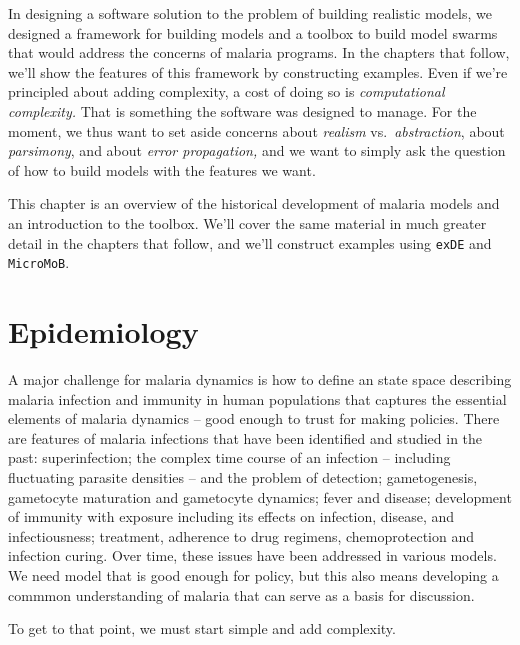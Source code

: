 \documentclass[
]{book}
\begin{document}
In designing a software solution to the problem of building realistic models, we designed a framework for building models and a toolbox to build model swarms that would address the concerns of malaria programs. In the chapters that follow, we'll show the features of this framework by constructing examples. Even if we're principled about adding complexity, a cost of doing so is \emph{computational complexity.} That is something the software was designed to manage. For the moment, we thus want to set aside concerns about \emph{realism} vs.~\emph{abstraction}, about \emph{parsimony}, and about \emph{error propagation,} and we want to simply ask the question of how to build models with the features we want.

This chapter is an overview of the historical development of malaria models and an introduction to the toolbox. We'll cover the same material in much greater detail in the chapters that follow, and we'll construct examples using \texttt{exDE} and \texttt{MicroMoB}.

\hypertarget{epidemiology}{%
\section{Epidemiology}\label{epidemiology}}

A major challenge for malaria dynamics is how to define an state space describing malaria infection and immunity in human populations that captures the essential elements of malaria dynamics -- good enough to trust for making policies. There are features of malaria infections that have been identified and studied in the past: superinfection; the complex time course of an infection -- including fluctuating parasite densities -- and the problem of detection; gametogenesis, gametocyte maturation and gametocyte dynamics; fever and disease; development of immunity with exposure including its effects on infection, disease, and infectiousness; treatment, adherence to drug regimens, chemoprotection and infection curing. Over time, these issues have been addressed in various models. We need model that is good enough for policy, but this also means developing a commmon understanding of malaria that can serve as a basis for discussion.

To get to that point, we must start simple and add complexity.
\end{document}
